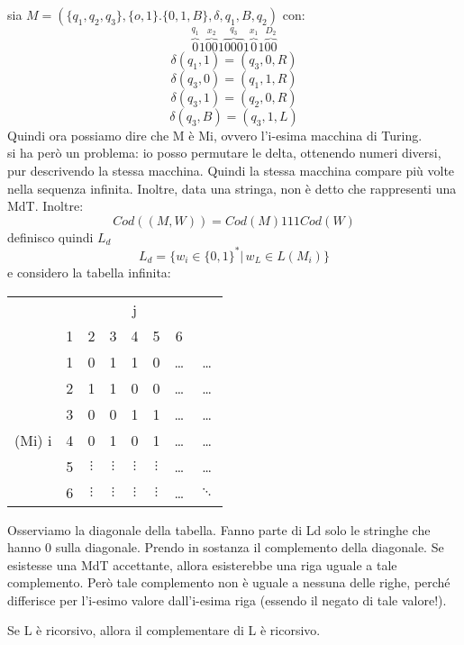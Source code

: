 	\begin{example}
		sia $M=(\{q_1,q_2,q_3\},\{o,1\}.\{0,1,B\},\delta,q_1,B,q_2)$ con:
		$$\overbrace{0}^{q_1}1\overbrace{00}^{x_2}1\overbrace{000}^{q_3}1\overbrace{0}^{x_1}1\overbrace{00}^{D_2}$$
		$$\delta(q_1,1)=(q_3,0,R)$$
		$$\delta(q_3,0)=(q_1,1,R)$$
		$$\delta(q_3,1)=(q_2,0,R)$$
		$$\delta(q_3,B)=(q_3,1,L)$$
		Quindi ora possiamo dire che M è Mi, ovvero l'i-esima macchina di Turing.
		\\
		si ha però un problema: io posso permutare le delta, ottenendo numeri diversi, pur descrivendo la stessa
		macchina. Quindi la stessa macchina compare più volte nella sequenza infinita. Inoltre, data una
		stringa, non è detto che rappresenti una MdT. Inoltre:
		$$Cod((M,W))=Cod(M)111Cod(W)$$
		definisco quindi $L_d$
		$$L_d=\{w_i\in\{0,1\}^*|\,w_L\in L(M_i)\}$$
		e considero la tabella infinita:
		\begin{center}
			\begin{tabular}{c c|c c c c c c}
				       &   &          &          & j        &          &                \\
				       & 1 & 2        & 3        & 4        & 5        & 6              \\
				\hline
				       & 1 & 0        & 1        & 1        & 0        & \ldots  & \ldots       \\
				       & 2 & 1        & 1        & 0        & 0        & \ldots  & \ldots       \\
				       & 3 & 0        & 0        & 1        & 1        & \ldots  & \ldots       \\
				(Mi) i & 4 & 0        & 1        & 0        & 1        & \ldots  & \ldots       \\
				       & 5 & $\vdots$ & $\vdots$ & $\vdots$ & $\vdots$ & \ldots  & \ldots       \\
				       & 6 & $\vdots$ & $\vdots$ & $\vdots$ & $\vdots$ & \ldots  & $\ddots$
			\end{tabular}
		\end{center}
		Osserviamo la diagonale della tabella. Fanno parte di Ld solo le stringhe che hanno 0 sulla
		diagonale. Prendo in sostanza il complemento della diagonale.
		Se esistesse una MdT accettante, allora esisterebbe una riga uguale a tale complemento.
		Però tale complemento non è uguale a nessuna delle righe, perché differisce per l'i-esimo valore
		dall'i-esima riga (essendo il negato di tale valore!).
	\end{example}
	\begin{theorem}
		Se L è ricorsivo, allora il complementare di L è ricorsivo.
	\end{theorem}
